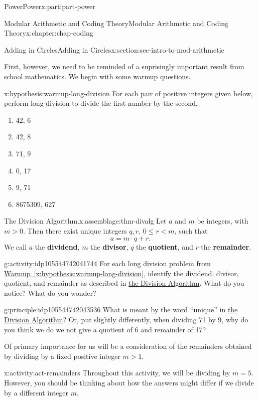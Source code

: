 \documentclass[oneside,10pt,]{book}
\newcommand{\xreffont}{\relax}
\newcommand{\terminology}[1]{\textbf{#1}}
\numberwithin{equation}{section}
\renewcommand{\le}{\leqslant}
\newcommand{\lt}{<}
\newcommand{\gt}{>}
\begin{document}
\begin{partptx}{Power}{}{Power}{}{}{x:part:part-power}
\begin{chapterptx}{Modular Arithmetic and Coding Theory}{}{Modular Arithmetic and Coding Theory}{}{}{x:chapter:chap-coding}
\begin{sectionptx}{Adding in Circles}{}{Adding in Circles}{}{}{x:section:sec-intro-to-mod-arithmetic}
\par
First, however, we need to be reminded of a suprisingly important result from school mathematics. We begin with some warmup questions.%
\begin{hypothesis}{}{}{x:hypothesis:warmup-long-division}%
For each pair of positive integers given below, perform long division to divide the first number by the second.%
%
\begin{enumerate}
\item{}42, 6%
\item{}42, 8%
\item{}71, 9%
\item{}0, 17%
\item{}9, 71%
\item{}8675309, 627%
\end{enumerate}
\end{hypothesis}
\begin{assemblage}{The Division Algorithm.}{x:assemblage:thm-divalg}%
Let \(a\) and \(m\) be integers, with \(m\gt 0\). Then there exist unique integers \(q,r\), \(0\le r \lt m\), such that%
\begin{equation*}
a = m\cdot q + r.
\end{equation*}
We call \(a\) the \terminology{dividend}, \(m\) the \terminology{divisor}, \(q\) the \terminology{quotient}, and \(r\) the \terminology{remainder}.%
\end{assemblage}
\begin{activity}{}{g:activity:idp105544742041744}%
For each long division problem from \hyperref[x:hypothesis:warmup-long-division]{Warmup~{\xreffont\ref{x:hypothesis:warmup-long-division}}}, identify the dividend, divisor, quotient, and remainder as described in \hyperref[x:assemblage:thm-divalg]{the Division Algorithm}. What do you notice? What do you wonder?%
\end{activity}%
\begin{principle}{}{}{g:principle:idp105544742043536}%
What is meant by the word ``unique'' in \hyperref[x:assemblage:thm-divalg]{the Division Algorithm}? Or, put slightly differently, when dividing 71 by 9, why do you think we do we not give a quotient of 6 and remainder of 17?%
\end{principle}
Of primary importance for us will be a consideration of the remainders obtained by dividing by a fixed positive integer \(m\gt 1\).%
\begin{activity}{}{x:activity:act-remainders}%
Throughout this activity, we will be dividing by \(m = 5\). However, you should be thinking about how the answers might differ if we divide by a different integer \(m\).%

\end{activity}
\end{sectionptx}
\end{chapterptx}
\end{partptx}
\end{document}
